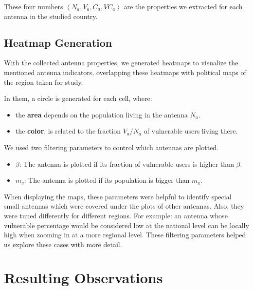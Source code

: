 These four numbers $\left< N_a, V_a, C_a, VC_a \right>$ are the properties we extracted for each antenna in the studied country.


\subsection{Heatmap Generation}
With the collected antenna properties, we generated heatmaps to visualize the mentioned antenna indicators, overlapping these heatmaps with political maps of the region taken for study.

In them, a circle is generated for each cell, where:
\begin{itemize}
	\item the \textbf{area} depends on the population living in the antenna $N_a$.
	\item the \textbf{color}, is related to the fraction ${V_a}/{N_a}$ of vulnerable users living there.
\end{itemize}

%

We used two filtering parameters to control which antennas are plotted.
\begin{itemize}
	\item $\beta$: The antenna is plotted if its fraction of vulnerable users is higher than $\beta$.
	\item $m_v$: The antenna is plotted if its population is bigger than $m_v$.
\end{itemize}

When displaying the maps, these parameters were helpful to identify special small antennas which were covered under the plots of other antennas. Also, they were tuned differently for different regions. For example: an antenna whose vulnerable percentage would be considered low at the national level can be locally high when zooming in at a more regional level. These filtering parameters helped us explore these cases with more detail.


\section{Resulting Observations} \label{results}

